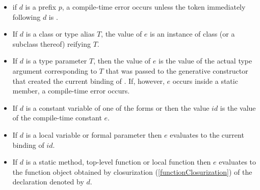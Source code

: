 \documentclass{article}
\begin{document}
\begin{itemize}
\item if $d$ is a prefix $p$, a compile-time error occurs unless the token immediately following $d$ is .
\item If $d$ is a class or type alias $T$, the value of $e$ is an instance of class  (or a subclass thereof) reifying $T$.
\item If $d$ is a type parameter $T$, then the value of $e$ is the value of the actual type argument corresponding to $T$ that was passed to the generative constructor that created the current binding of \THIS{}.
If, however, $e$ occurs inside a static member, a compile-time error occurs.

\item If $d$ is a constant variable of one of the forms  or  then the value $id$ is the value of the compile-time constant $e$.
\item If $d$ is a local variable or formal parameter then $e$ evaluates to the current binding of $id$.
\item If $d$ is a static method, top-level function or local function then $e$ evaluates to the function object obtained by closurization (\ref{functionClosurization}) of the declaration denoted by $d$.

\end{itemize}
\end{document}
